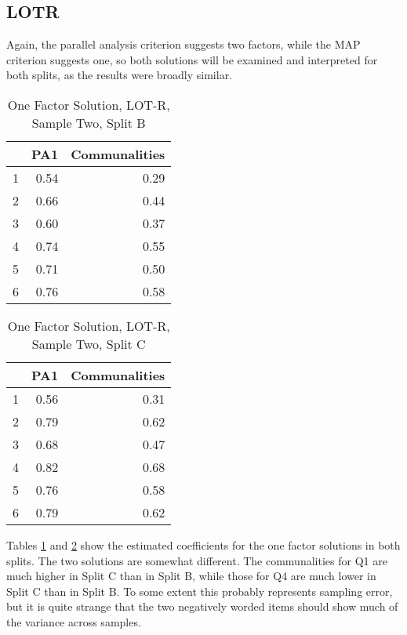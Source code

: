 \documentclass{article}
\begin{document}
\subsection{LOTR}
\label{sec:lotr-1}





Again, the parallel analysis criterion suggests two factors, while the MAP criterion suggests one, so both solutions will be examined and interpreted for both splits, as the results were broadly similar. 

\begin{table}[ht]
\centering
\begin{tabular}{rrr}
  \hline
 & PA1 & Communalities \\ 
  \hline
1 & 0.54 & 0.29 \\ 
  2 & 0.66 & 0.44 \\ 
  3 & 0.60 & 0.37 \\ 
  4 & 0.74 & 0.55 \\ 
  5 & 0.71 & 0.50 \\ 
  6 & 0.76 & 0.58 \\ 
   \hline
\end{tabular}
\caption{One Factor Solution, LOT-R, Sample Two, Split B} 
\label{tab:hom2blotr1}
\end{table}

\begin{table}[ht]
\centering
\begin{tabular}{rrr}
  \hline
 & PA1 & Communalities \\ 
  \hline
1 & 0.56 & 0.31 \\ 
  2 & 0.79 & 0.62 \\ 
  3 & 0.68 & 0.47 \\ 
  4 & 0.82 & 0.68 \\ 
  5 & 0.76 & 0.58 \\ 
  6 & 0.79 & 0.62 \\ 
   \hline
\end{tabular}
\caption{One Factor Solution, LOT-R, Sample Two, Split C} 
\label{tab:hom2clotr1}
\end{table}
Tables \ref{tab:hom2blotr1} and \ref{tab:hom2clotr1} show the estimated coefficients for the one factor solutions in both splits. The two solutions are somewhat different. The communalities for Q1 are much higher in Split C than in Split B, while those for Q4 are much lower in Split C than in Split B. To some extent this probably represents sampling error, but it is quite strange that the two negatively worded items should show much of the variance across samples. 
\end{document}

